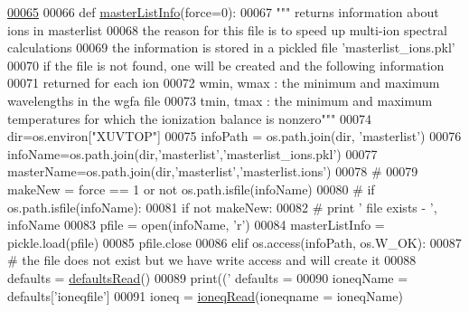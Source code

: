 \begin{DoxyCode}
\hypertarget{namespacepyneb_1_1utils_1_1__chianti__tools_l00065}{}\hyperlink{namespacepyneb_1_1utils_1_1__chianti__tools_a5677fc0d50bd22a853c14b4b2606b89e}{00065} 
00066 \textcolor{keyword}{def }\hyperlink{namespacepyneb_1_1utils_1_1__chianti__tools_a5677fc0d50bd22a853c14b4b2606b89e}{masterListInfo}(force=0):
00067     \textcolor{stringliteral}{""" returns information about ions in masterlist}
00068 \textcolor{stringliteral}{    the reason for this file is to speed up multi-ion spectral calculations}
00069 \textcolor{stringliteral}{    the information is stored in a pickled file 'masterlist\_ions.pkl'}
00070 \textcolor{stringliteral}{    if the file is not found, one will be created and the following information}
00071 \textcolor{stringliteral}{    returned for each ion}
00072 \textcolor{stringliteral}{    wmin, wmax :  the minimum and maximum wavelengths in the wgfa file}
00073 \textcolor{stringliteral}{    tmin, tmax :  the minimum and maximum temperatures for which the ionization balance is nonzero"""}
00074     dir=os.environ[\textcolor{stringliteral}{"XUVTOP"}]
00075     infoPath = os.path.join(dir, \textcolor{stringliteral}{'masterlist'})
00076     infoName=os.path.join(dir,\textcolor{stringliteral}{'masterlist'},\textcolor{stringliteral}{'masterlist\_ions.pkl'})
00077     masterName=os.path.join(dir,\textcolor{stringliteral}{'masterlist'},\textcolor{stringliteral}{'masterlist.ions'})
00078     \textcolor{comment}{#}
00079     makeNew = force == 1 \textcolor{keywordflow}{or} \textcolor{keywordflow}{not} os.path.isfile(infoName)
00080 \textcolor{comment}{#    if os.path.isfile(infoName):}
00081     \textcolor{keywordflow}{if} \textcolor{keywordflow}{not} makeNew:
00082 \textcolor{comment}{#       print ' file exists - ',  infoName}
00083         pfile = open(infoName, \textcolor{stringliteral}{'}\textcolor{stringliteral}{r')}
00084 \textcolor{stringliteral}{        masterListInfo = pickle.load(pfile)}
00085 \textcolor{stringliteral}{        pfile.close}
00086 \textcolor{stringliteral}{    }\textcolor{keywordflow}{elif} os.access(infoPath, os.W\_OK):
00087         \textcolor{comment}{# the file does not exist but we have write access and will create it}
00088         defaults = \hyperlink{namespacepyneb_1_1utils_1_1__chianti__tools_a235ada2c4e384f436dbade0913107585}{defaultsRead}()
00089         print((\textcolor{stringliteral}{' defaults = %
00090         ioneqName = defaults[\textcolor{stringliteral}{'ioneqfile'}]
00091         ioneq = \hyperlink{namespacepyneb_1_1utils_1_1__chianti__tools_a8b6257cfe133ac906966b20c8721f82a}{ioneqRead}(ioneqname = ioneqName)
}
\end{DoxyCode}
